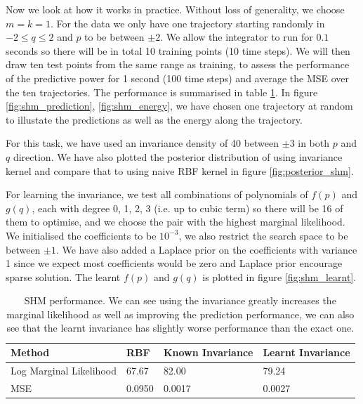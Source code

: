\documentclass{statsmsc}
\begin{document}
Now we look at how it works in practice.
Without loss of generality, we choose $m=k=1$.
For the data we only have one trajectory starting randomly in $-2\le q\le2$ and $p$ to be between $\pm 2$.
We allow the integrator to run for $0.1$ seconds so there will be in total 10 training points (10 time steps). 
We will then draw ten test points from the same range as training, to assess the performance of the predictive power for 1 second (100 time steps) and average the MSE over the ten trajectories. 
The performance is summarised in table \ref{tab:shm_performance}.
In figure \ref{fig:shm_prediction}, \ref{fig:shm_energy}, we have chosen one trajectory at random to illustate the predictions as well as the energy along the trajectory.

For this task, we have used an invariance density of 40 between $\pm 3$ in both $p$ and $q$ direction.
We have also plotted the posterior distribution of using invariance kernel and compare that to using naive RBF kernel in figure \ref{fig:posterior_shm}.

For learning the invariance, we test all combinations of polynomials of $f(p)$ and $g(q)$, each with degree 0, 1, 2, 3 (i.e. up to cubic term) so there will be 16 of them to optimise, and we choose the pair with the highest marginal likelihood. 
We initialised the coefficients to be $10^{-3}$, we also restrict the search space to be between $\pm 1$.
We have also added a Laplace prior on the coefficients with variance 1 since we expect most coefficients would be zero and Laplace prior encourage sparse solution.
The learnt $f(p)$ and $g(q)$ is plotted in figure \ref{fig:shm_learnt}.

\begin{table}[H]
  \centering
  \begin{tabular}{l l l l }
\hline
Method           & RBF & Known Invariance&  Learnt Invariance\\
  \hline
Log Marginal Likelihood & 67.67 & 82.00 & 79.24 \\
MSE & 0.0950 & 0.0017 & 0.0027 \\
                    \hline
  \end{tabular}
  \caption{SHM performance. We can see using the invariance greatly increases the marginal likelihood as well as improving the prediction performance, we can also see that the learnt invariance has slightly worse performance than the exact one.}
  \label{tab:shm_performance}
\end{table}
\end{document}
